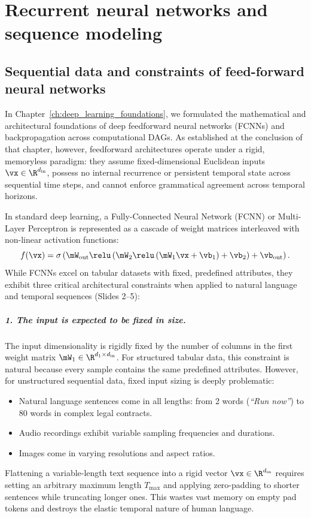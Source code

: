 \documentclass[../../main.tex]{subfiles}
\begin{document}
\chapter{Recurrent neural networks and sequence modeling}
\label{ch:rnn_sequence_modeling}

\section{Sequential data and constraints of feed-forward neural networks}
\label{sec:fcnn_limits}

In Chapter~\ref{ch:deep_learning_foundations}, we formulated the mathematical and architectural foundations of deep feedforward neural networks (FCNNs) and backpropagation across computational DAGs. As established at the conclusion of that chapter, however, feedforward architectures operate under a rigid, memoryless paradigm: they assume fixed-dimensional Euclidean inputs $\vx \in \R^{d_{\text{in}}}$, possess no internal recurrence or persistent temporal state across sequential time steps, and cannot enforce grammatical agreement across temporal horizons.

In standard deep learning, a Fully-Connected Neural Network (FCNN) or Multi-Layer Perceptron is represented as a cascade of weight matrices interleaved with non-linear activation functions:
\begin{equation}
\label{eq:fcnn_cascade}
f(\vx) = \sigma\left( \mW_{\text{out}} \relu\left( \mW_2 \relu\left( \mW_1 \vx + \vb_1 \right) + \vb_2 \right) + \vb_{\text{out}} \right).
\end{equation}
While FCNNs excel on tabular datasets with fixed, predefined attributes, they exhibit three critical architectural constraints when applied to natural language and temporal sequences (Slides 2--5):

\paragraph{1. The input is expected to be fixed in size.}
The input dimensionality is rigidly fixed by the number of columns in the first weight matrix $\mW_1 \in \R^{d_1 \times d_{\text{in}}}$. For structured tabular data, this constraint is natural because every sample contains the same predefined attributes. However, for unstructured sequential data, fixed input sizing is deeply problematic:
\begin{itemize}
    \item Natural language sentences come in all lengths: from 2 words (\textit{``Run now''}) to 80 words in complex legal contracts.
    \item Audio recordings exhibit variable sampling frequencies and durations.
    \item Images come in varying resolutions and aspect ratios.
\end{itemize}
Flattening a variable-length text sequence into a rigid vector $\vx \in \R^{d_{\text{in}}}$ requires setting an arbitrary maximum length $T_{\max}$ and applying zero-padding to shorter sentences while truncating longer ones. This wastes vast memory on empty pad tokens and destroys the elastic temporal nature of human language.
\end{document}
